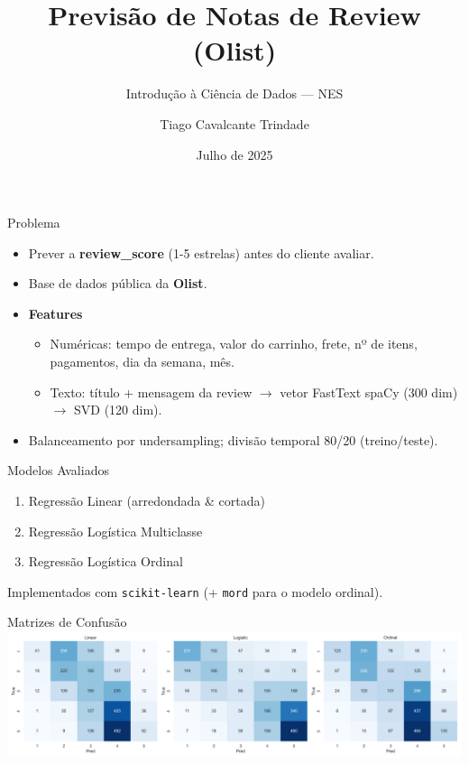 \documentclass{beamer}
\title[Previsão de Notas]{Previsão de Notas de Review (Olist)}
\subtitle{Introdução à Ciência de Dados — NES}
\author{Tiago Cavalcante Trindade}
\date{Julho de 2025}
\begin{document}
\begin{frame}
  \titlepage
\end{frame}

\begin{frame}{Problema}
  \begin{itemize}
    \item Prever a \textbf{review\_score} (1-5 estrelas) antes do cliente avaliar.
    \item Base de dados pública da \textbf{Olist}.
    \item \textbf{Features}
          \begin{itemize}
            \item Numéricas: tempo de entrega, valor do carrinho, frete, nº de itens, pagamentos, dia da semana, mês.
            \item Texto: título + mensagem da review $\rightarrow$ vetor FastText spaCy (300 dim) $\rightarrow$ SVD (120 dim).
          \end{itemize}
    \item Balanceamento por undersampling; divisão temporal 80/20 (treino/teste).
  \end{itemize}
\end{frame}

\begin{frame}{Modelos Avaliados}
  \begin{enumerate}
    \item Regressão Linear (arredondada \& cortada)
    \item Regressão Logística Multiclasse
    \item Regressão Logística Ordinal
  \end{enumerate}
  Implementados com \texttt{scikit-learn} (+ \texttt{mord} para o modelo ordinal).
\end{frame}

\begin{frame}{Matrizes de Confusão}
  \centering
  \includegraphics[width=0.95\linewidth]{../figures/confusion_matrices.png}
\end{frame}
\end{document}
